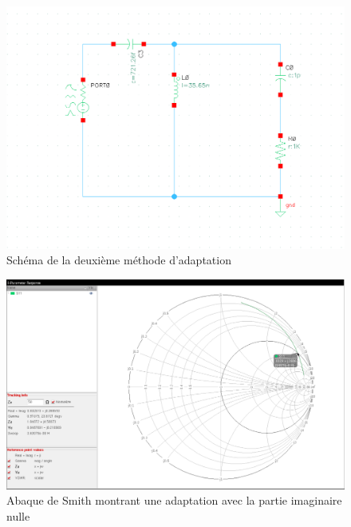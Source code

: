\documentclass[a4paper]{article}
\begin{document}
\begin{figure}[!htb]
\begin{center}
  \includegraphics[scale=0.47]{architecture-Lparalle-Cseries.png}
  \caption{Sch\'ema de la deuxi\`eme m\'ethode d'adaptation}
\end{center}
\end{figure}

\clearpage

\begin{figure}[!htb]
\begin{center}
  \includegraphics[width=\linewidth]{smith-induct-parallele-2nd-adapt.png}
  \caption{Abaque de Smith montrant une adaptation avec la partie imaginaire nulle}
\end{center}
\end{figure}
\end{document}
